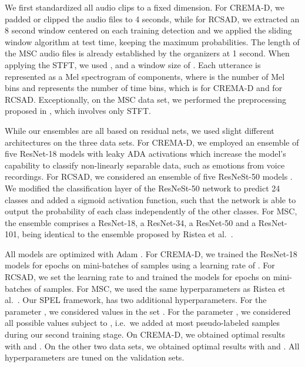 \documentclass[a4paper]{article}
\begin{document}
We first standardized all audio clips to a fixed dimension. For CREMA-D, we padded or clipped the audio files to 4 seconds, while for RCSAD, we extracted an 8 second window centered on each training detection and we applied the sliding window algorithm at test time, keeping the maximum probabilities. The length of the MSC audio files is already established by the organizers at 1 second. When applying the STFT, we used ,  and a window size of . Each utterance is represented as a Mel spectrogram of  components, where  is the number of Mel bins and  represents the number of time bins, which is  for CREMA-D and  for RCSAD. Exceptionally, on the MSC data set, we performed the preprocessing proposed in \cite{ristea2020you}, which involves only STFT.

While our ensembles are all based on residual nets, we used slight different architectures on the three data sets. For CREMA-D, we employed an ensemble of five ResNet-18 models \cite{He-CVPR-2016} with leaky ADA activations \cite{georgescu2020non} which increase the model's capability to classify non-linearly separable data, such as emotions from voice recordings. For RCSAD, we considered an ensemble of five ResNeSt-50 models \cite{zhang2020resnest}. We modified the classification layer of the ResNeSt-50 network to predict 24 classes and added a sigmoid activation function, such that the network is able to output the probability of each class independently of the other classes. For MSC, the ensemble comprises a ResNet-18, a ResNet-34, a ResNet-50 and a ResNet-101, being identical to the ensemble proposed by Ristea et al.~\cite{ristea2020you}.
 
All models are optimized with Adam \cite{Kingma-ICLR-2015}. For CREMA-D, we trained the ResNet-18 models for  epochs on mini-batches of  samples using a learning rate of . For RCSAD, we set the learning rate to  and trained the models for  epochs on mini-batches of  samples. For MSC, we used the same hyperparameters as Ristea et al.~\cite{ristea2020you}. Our SPEL framework, has two additional hyperparameters. For the parameter , we considered values in the set . For the parameter , we considered all possible values subject to , i.e.~we added at most  pseudo-labeled samples during our second training stage. On CREMA-D, we obtained optimal results with  and . On the other two data sets, we obtained optimal results with  and . All hyperparameters are tuned on the validation sets.
\end{document}
